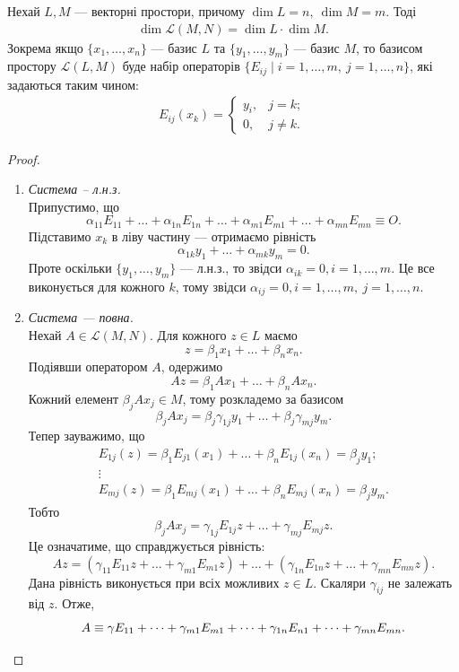 \documentclass{math_library}
\begin{document}
	\begin{proposition}
	\label{dimension_of_space_of_linear_operators}
	Нехай $L,M$ --- векторні простори, причому $\dim L = n,\ \dim M = m$. Тоді
	\begin{align*}
	\dim \mathcal{L}(M,N) = \dim L \cdot \dim M.
	\end{align*}
	Зокрема якщо $\{x_1,\dots,x_n\}$ --- базис $L$ та $\{y_1,\dots,y_m\}$ --- базис $M$, то базисом простору $\mathcal{L}(L,M)$ буде набір операторів $\{E_{ij} \mid i = 1,\dots,m,\ j = 1,\dots,n\}$, які задаються таким чином:
	\begin{align*}
	E_{ij}(x_k) = \begin{cases} y_i, & j = k; \\ 0, & j \neq k. \end{cases}
	\end{align*}
	\end{proposition}
	
	\begin{proof}
	\begin{enumerate}[wide=0pt,topsep=0pt,label={\Roman*.}]
	\item \textit{Система -- л.н.з.}\\
	Припустимо, що
	\[
	\alpha_{11} E_{11} + \dots + \alpha_{1n} E_{1n} + \dots + \alpha_{m1} E_{m1} + \dots + \alpha_{mn} E_{mn} \equiv O.
	\]
	Підставимо $x_k$ в ліву частину --- отримаємо рівність 
	\[
	\alpha_{1k} y_1 + \dots + \alpha_{mk} y_m = 0.
	\] 
	Проте оскільки $\{y_1,\dots,y_m\}$ --- л.н.з., то звідси $\alpha_{ik} = 0, i = 1,\dots,m$. Це все виконується для кожного $k$, тому звідси $\alpha_{ij} = 0, i = 1,\dots,m,\ j = 1,\dots,n$.
	
	\item \textit{Система --- повна.}\\
	Нехай $A \in \mathcal{L}(M,N)$. Для кожного $z \in L$ маємо 
	\[
	z = \beta_1 x_1 + \dots + \beta_n x_n.
	\]
	Подіявши оператором $A$, одержимо
	\[
	Az = \beta_1 Ax_1 + \dots + \beta_n Ax_n.
	\]
	Кожний елемент $\beta_j A x_j \in M$, тому розкладемо за базисом 
	\[
	\beta_j Ax_j = \beta_j \gamma_{1j} y_1 + \dots + \beta_j \gamma_{mj} y_m.
	\]
	Тепер зауважимо, що
	\begin{align*}
	E_{1j}(z) = \beta_1 E_{j1}(x_1) + \dots + \beta_n E_{1j}(x_n) = \beta_j y_1; \\
	\vdots \\
	E_{mj}(z) = \beta_1 E_{mj}(x_1) + \dots + \beta_n E_{mj}(x_n) = \beta_j y_m.
	\end{align*}
	Тобто 
	\[
	\beta_j Ax_j = \gamma_{1j} E_{1j} z + \dots + \gamma_{mj} E_{mj} z.
	\]
	Це означатиме, що справджується рівність:
	\[
	Az = (\gamma_{11} E_{11} z + \dots + \gamma_{m1} E_{m1}z) + \dots + (\gamma_{1n} E_{1n}z + \dots + \gamma_{mn} E_{mn}z).
	\]
	Дана рівність виконується при всіх можливих $z \in L$. Скаляри $\gamma_{ij}$ не залежать від $z$. Отже,
	\[
	A \equiv \gamma E_{11} + \dots + \gamma_{m1} E_{m1} + \dots + \gamma_{1n} E_{n1} + \dots + \gamma_{mn} E_{mn}. \qedhere
	\]
	\end{enumerate}
	\end{proof}
	
\end{document}
